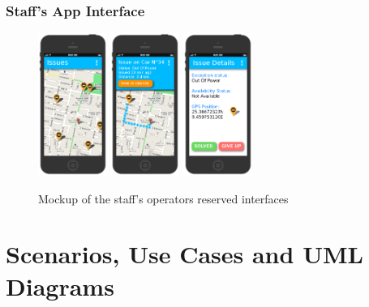 \documentclass[11pt]{article} %
\begin{document}
\subsubsection{Staff's App Interface}
\begin{figure}[H]
	\centering
	\includegraphics[width=0.2\textwidth]{../mockup/AIssues.png} \hspace{0.8cm}
	\includegraphics[width=0.2\textwidth]{../mockup/BSelectedIssue.png} \hspace{0.8cm}
	\includegraphics[width=0.2\textwidth]{../mockup/CIssueDetail.png}
	\caption{Mockup of the staff's operators reserved interfaces}
\end{figure}
  

\newpage
\section{Scenarios, Use Cases and UML Diagrams}
\end{document}
